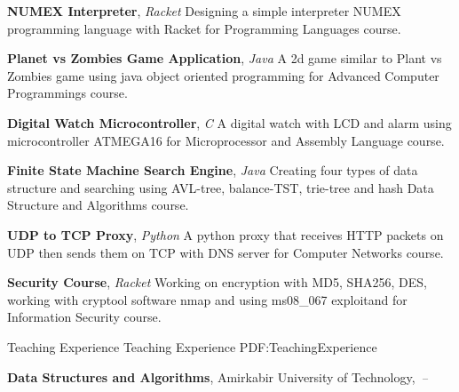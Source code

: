\documentclass[letterpaper,MMMyyyy,nonstopmode]{resume}
\begin{document}
\begin{Body}
\BulletItem
\textbf{NUMEX Interpreter},
\textit{\small{Racket}}
\hfill
{\normalsize{
\href{https://github.com/aliyazdi75/NUMEX-Interpreter}
{\faGithub}
}}
\Item
Designing a simple interpreter NUMEX programming language
with Racket for Programming Languages course.

\BigGap
\BulletItem
\textbf{Planet vs Zombies Game Application},
\textit{\small{Java}}
\hfill
{\normalsize{
\href{https://github.com/aliyazdi75/Planet\_vs\_Zombies}
{\faGithub}
}}
\Item
A 2d game similar to Plant vs Zombies game using java
object oriented programming for Advanced Computer Programmings course.

\BigGap
\BulletItem
\textbf{Digital Watch Microcontroller},
\textit{\small{C}}
\hfill
{\normalsize{
\href{https://github.com/aliyazdi75/Digital-Watch-with-LCD}
{\faGithub}
}}
\Item
A digital watch with LCD and alarm using microcontroller
ATMEGA16 for Microprocessor and Assembly Language course.



\BigGap
\BulletItem
\textbf{Finite State Machine Search Engine},
\textit{\small{Java}}
\hfill
{\normalsize{
\href{https://github.com/aliyazdi75/Finite-State-Machine}
{\faGithub}
}}
\Item
Creating four types of data structure and searching using
AVL-tree, balance-TST, trie-tree and hash Data Structure and Algorithms course.

\BigGap
\BulletItem
\textbf{UDP to TCP Proxy},
\textit{\small{Python}}
\hfill
{\normalsize{
\href{https://github.com/aliyazdi75/DNS-UDP-TCP-Proxy}
{\faGithub}
}}
\Item
A python proxy that receives HTTP packets on UDP
then sends them on TCP with DNS server for Computer Networks course.

\BigGap
\BulletItem
\textbf{Security Course},
\textit{\small{Racket}}
\hfill
{\normalsize{
\href{https://github.com/aliyazdi75/My-Security-Course}
{\faGithub}
}}
\Item
Working on encryption with MD5, SHA256, DES,
working with cryptool software nmap
and using ms08\_067 exploitand for Information Security course.



\Section
{Teaching Experience}
{Teaching Experience}
{PDF:TeachingExperience}

\Entry
\textbf{Data Structures and Algorithms},
Amirkabir University of Technology,
\hfill
\textsl{\small{\,--\,}}


\end{Body}
\end{document}
